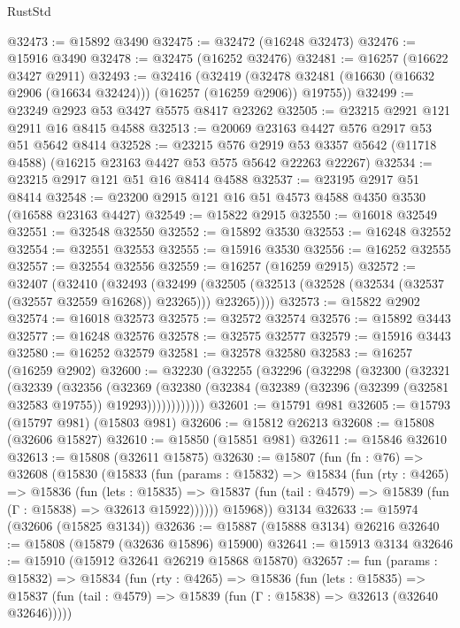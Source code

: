 \begin{lexlean}{RustStd}
\begin{coremodule}
@32473 := @15892 @3490
@32475 := @32472 (@16248 @32473)
@32476 := @15916 @3490
@32478 := @32475 (@16252 @32476)
@32481 := @16257 (@16622 @3427 @2911)
@32493 := @32416
    (@32419 (@32478 @32481 (@16630 (@16632 @2906 (@16634 @32424))) (@16257 (@16259 @2906)) @19755))
@32499 := @23249 @2923 @53 @3427 @5575 @8417 @23262
@32505 := @23215 @2921 @121 @2911 @16 @8415 @4588
@32513 := @20069 @23163 @4427 @576 @2917 @53 @51 @5642 @8414
@32528 := @23215
    @576
    @2919
    @53
    @3357
    @5642
    (@11718 @4588)
    (@16215 @23163 @4427 @53 @575 @5642 @22263 @22267)
@32534 := @23215 @2917 @121 @51 @16 @8414 @4588
@32537 := @23195 @2917 @51 @8414
@32548 := @23200 @2915 @121 @16 @51 @4573 @4588 @4350 @3530 (@16588 @23163 @4427)
@32549 := @15822 @2915
@32550 := @16018 @32549
@32551 := @32548 @32550
@32552 := @15892 @3530
@32553 := @16248 @32552
@32554 := @32551 @32553
@32555 := @15916 @3530
@32556 := @16252 @32555
@32557 := @32554 @32556
@32559 := @16257 (@16259 @2915)
@32572 := @32407
    (@32410
      (@32493
        (@32499 (@32505 (@32513 (@32528 (@32534 (@32537 (@32557 @32559 @16268)) @23265))) @23265))))
@32573 := @15822 @2902
@32574 := @16018 @32573
@32575 := @32572 @32574
@32576 := @15892 @3443
@32577 := @16248 @32576
@32578 := @32575 @32577
@32579 := @15916 @3443
@32580 := @16252 @32579
@32581 := @32578 @32580
@32583 := @16257 (@16259 @2902)
@32600 := @32230
    (@32255
      (@32296
        (@32298
          (@32300
            (@32321
              (@32339
                (@32356
                  (@32369
                    (@32380
                      (@32384 (@32389 (@32396 (@32399 (@32581 @32583 @19755)) @19293))))))))))))
@32601 := @15791 @981
@32605 := @15793 (@15797 @981) (@15803 @981)
@32606 := @15812 @26213
@32608 := @15808 (@32606 @15827)
@32610 := @15850 (@15851 @981)
@32611 := @15846 @32610
@32613 := @15808 (@32611 @15875)
@32630 := @15807
    (fun (fn : @76) =>
    @32608
      (@15830
        (@15833
          (fun (params : @15832) =>
          @15834
            (fun (rty : @4265) =>
            @15836
              (fun (lets : @15835) =>
              @15837 (fun (tail : @4579) => @15839 (fun (Γ : @15838) => @32613 @15922))))))
        @15968))
    @3134
@32633 := @15974 (@32606 (@15825 @3134))
@32636 := @15887 (@15888 @3134) @26216
@32640 := @15808 (@15879 (@32636 @15896) @15900)
@32641 := @15913 @3134
@32646 := @15910 (@15912 @32641 @26219 @15868 @15870)
@32657 := fun (params : @15832) =>
  @15834
    (fun (rty : @4265) =>
    @15836
      (fun (lets : @15835) =>
      @15837 (fun (tail : @4579) => @15839 (fun (Γ : @15838) => @32613 (@32640 @32646)))))

\end{coremodule}
\end{lexlean}
